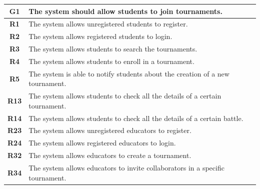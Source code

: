 \documentclass[12pt, a4paper]{report}
\begin{document}
    \begin{table}[H]
        \begin{tabularx}{\textwidth}{cX}
        \textbf{G1}  & The system should allow students to join tournaments.                            \\ \hline
        \textbf{R1}  & The system allows unregistered students to register.                             \\
        \textbf{R2}  & The system allows registered students to login.                                  \\
        \textbf{R3}  & The system allows students to search the tournaments.                            \\
        \textbf{R4}  & The system allows students to enroll in a tournament.                            \\
        \textbf{R5}  & The system is able to notify students about the creation of a new tournament.    \\
        \textbf{R13} & The system allows students to check all the details of a certain tournament.     \\
        \textbf{R14} & The system allows students to check all the details of a certain battle.         \\
        \textbf{R23} & The system allows unregistered educators to register.                            \\
        \textbf{R24} & The system allows registered educators to login.                                 \\
        \textbf{R32} & The system allows educators to create a tournament.                              \\
        \textbf{R34} & The system allows educators to invite collaborators in a specific tournament.    \\
        \end{tabularx}
    \end{table}
\end{document}
